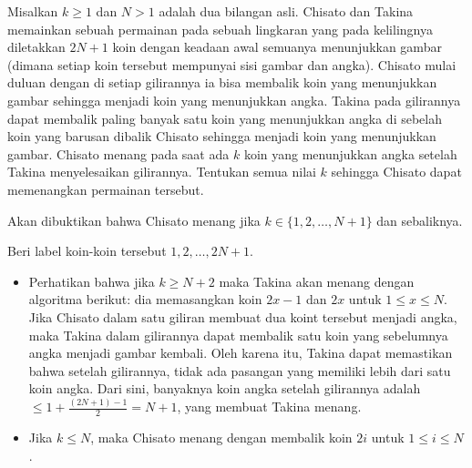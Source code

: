 \documentclass[11pt]{scrartcl}
\begin{document}
\begin{soaljawab}
    Misalkan $k \ge 1$ dan $N > 1$ adalah dua bilangan asli. Chisato dan Takina memainkan sebuah permainan pada sebuah lingkaran yang pada kelilingnya diletakkan $2N+1$ koin dengan keadaan awal semuanya menunjukkan gambar (dimana setiap koin tersebut mempunyai sisi gambar dan angka). Chisato mulai duluan dengan di setiap gilirannya ia bisa membalik koin yang menunjukkan gambar sehingga menjadi koin yang menunjukkan angka. Takina pada gilirannya dapat membalik paling banyak satu koin yang menunjukkan angka di sebelah koin yang barusan dibalik Chisato sehingga menjadi koin yang menunjukkan gambar. Chisato menang pada saat ada $k$ koin yang menunjukkan angka setelah Takina menyelesaikan gilirannya. Tentukan semua nilai $k$ sehingga Chisato dapat memenangkan permainan tersebut.
    \begin{solusi}
        Akan dibuktikan bahwa Chisato menang jika $k \in \{1,2,\dots,N+1\}$ dan sebaliknya.

        Beri label koin-koin tersebut $1,2,\dots,2N+1$. 
        
        \begin{itemize}
            \item         Perhatikan bahwa jika $k \ge N+2$ maka Takina akan menang dengan algoritma berikut: dia memasangkan koin $2x-1$ dan $2x$ untuk $1 \le x \le N$. Jika Chisato dalam satu giliran membuat dua koint tersebut menjadi angka, maka Takina dalam gilirannya dapat membalik satu koin yang sebelumnya angka menjadi gambar kembali. Oleh karena itu, Takina dapat memastikan bahwa setelah gilirannya, tidak ada pasangan yang memiliki lebih dari satu koin angka. Dari sini, banyaknya koin angka setelah gilirannya adalah $\le 1 + \frac{(2N+1)-1}{2}=N+1$, yang membuat Takina menang.

        \item Jika $k \le N$, maka Chisato menang dengan membalik koin $2i$ untuk $1 \le i \le N$.


\end{itemize}
\end{solusi}
\end{soaljawab}
\end{document}
